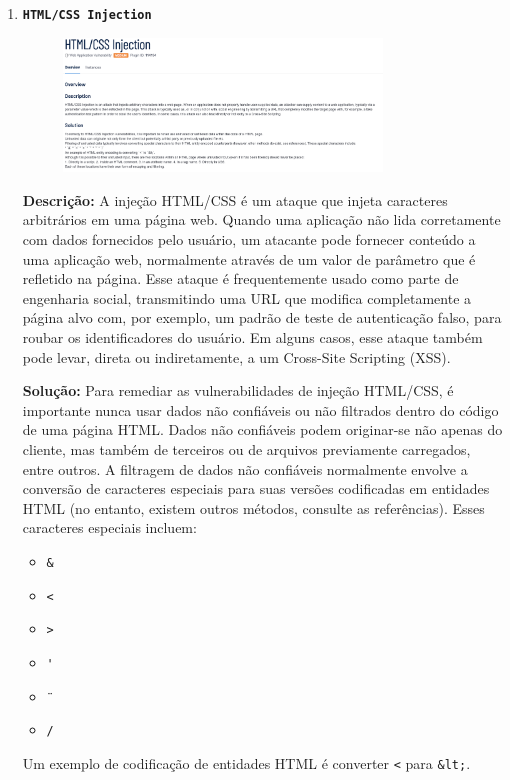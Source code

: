 \documentclass[a4paper,12pt]{article}
\begin{document}
\begin{enumerate}
\item \textbf{\texttt{HTML/CSS Injection}}

                        \begin{figure}[h!]
                        \centering
                        \includegraphics[width=0.8\textwidth]{assets/images-was/Vulnerabilidades Relacionadas a Injeção de Código/Outras Injeções/HTML-CSS Injection.png}
                        \end{figure}
                        \FloatBarrier
                        \textbf{Descrição:}  A injeção HTML/CSS é um ataque que injeta caracteres arbitrários em uma página web. Quando uma aplicação não lida corretamente com dados fornecidos pelo usuário, um atacante pode fornecer conteúdo a uma aplicação web, normalmente através de um valor de parâmetro que é refletido na página. Esse ataque é frequentemente usado como parte de engenharia social, transmitindo uma URL que modifica completamente a página alvo com, por exemplo, um padrão de teste de autenticação falso, para roubar os identificadores do usuário. Em alguns casos, esse ataque também pode levar, direta ou indiretamente, a um Cross-Site Scripting (XSS).


\textbf{Solução:} Para remediar as vulnerabilidades de injeção HTML/CSS, é importante nunca usar dados não confiáveis ou não filtrados dentro do código de uma página HTML.
Dados não confiáveis podem originar-se não apenas do cliente, mas também de terceiros ou de arquivos previamente carregados, entre outros.
A filtragem de dados não confiáveis normalmente envolve a conversão de caracteres especiais para suas versões codificadas em entidades HTML (no entanto, existem outros métodos, consulte as referências). Esses caracteres especiais incluem:
\begin{itemize}
    \item \texttt{\&}
    \item \texttt{<}
    \item \texttt{>}
    \item \texttt{\'}
    \item \texttt{\"}
    \item \texttt{/}
\end{itemize}
Um exemplo de codificação de entidades HTML é converter \texttt{<} para \texttt{\&lt;}.


\end{enumerate}
\end{document}
